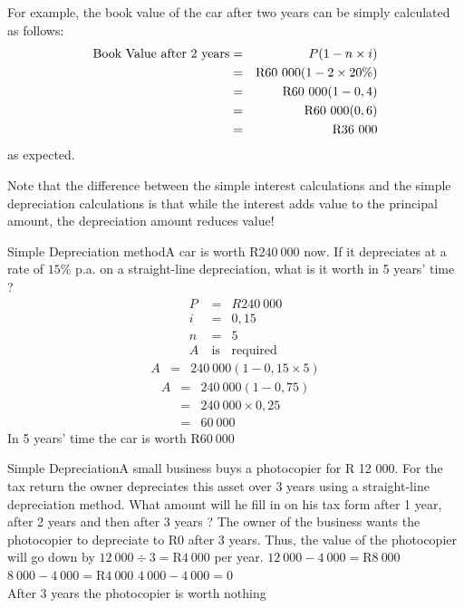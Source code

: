 For example, the book value of the car after two years can be simply calculated as follows:
\begin{eqnarray*}
\mbox{Book Value after 2 years} &=& P(1-n\times i)\\
&=&\rm{R}60~000(1-2\times 20\%)\\
&=&\rm{R}60~000(1-0,4)\\
&=&\rm{R}60~000(0,6)\\
&=&\rm{R}36~000
\end{eqnarray*}
as expected.

Note that the difference between the simple interest calculations and the simple depreciation calculations is that while the interest adds value to the principal amount, the depreciation amount reduces value!

\begin{wex}{Simple Depreciation method}{A car is worth R$240~000$ now.  If it depreciates at a rate of $15\%$ p.a. on a straight-line depreciation, what is it worth in 5 years' time ?}{
\begin{eqnarray*}
P &=& R240~000\\
i &=& 0,15\\
n &=& 5\\
A~ &\mbox{is}& \mbox{required}
\end{eqnarray*}
\begin{eqnarray*}
A &=& 240~000(1-0,15\times 5)
\end{eqnarray*}
\begin{eqnarray*}
A &=& 240~000(1 - 0,75)\\
&=& 240~000\times 0,25\\
&=& 60~000
\end{eqnarray*}
In 5 years' time the car is worth R$60~000$}
\end{wex}

\begin{wex}{Simple Depreciation}{A small business buys a photocopier for R 12 000.  For the tax return the owner depreciates this asset over 3 years using a straight-line depreciation method.  What amount will he fill in on his tax form after 1 year, after 2 years and then after 3 years ?}{
The owner of the business wants the photocopier to depreciate to R0 after 3 years.
Thus, the value of the photocopier will go down by $12~000 \div 3 = \mbox{R}4~000$ per year.
$12~000 - 4~000 = \mbox{R}8~000$
$8~000 - 4~000 = \mbox{R}4~000$
$4~000 - 4~000 = 0$\\
After 3 years the photocopier is worth nothing}
\end{wex}

